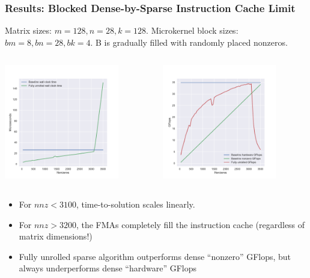\documentclass[9pt]{beamer}
\begin{document}
\begin{frame}[fragile]
  \frametitle{Results: Blocked Dense-by-Sparse Instruction Cache Limit}
  Matrix sizes: $m=128, n=28, k=128$.
  Microkernel block sizes: $bm=8, bn=28, bk=4$.
  B is gradually filled with randomly placed nonzeros.

  \begin{columns}[t]
    \begin{column}{0.45\textwidth}
      \centering
      \includegraphics[height=5cm]{images/unrolled_scaling_time.pdf}
    \end{column}
    \begin{column}{0.45\textwidth}
      \centering
      \includegraphics[height=5cm]{images/unrolled_scaling_flops.pdf}
    \end{column}
  \end{columns}

  \begin{itemize}
    \item For $nnz < 3100$, time-to-solution scales linearly.
    \item For $nnz > 3200$, the FMAs completely fill the instruction cache (regardless of matrix dimensions!)
    \item Fully unrolled sparse algorithm outperforms dense ``nonzero'' GFlops, but always underperforms dense ``hardware'' GFlops
    
  \end{itemize}
\end{frame}
\end{document}
